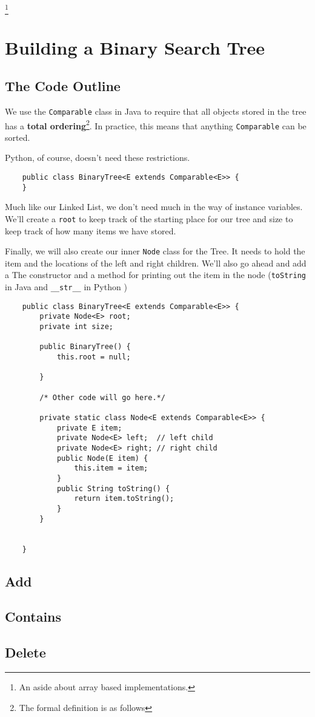 \footnote{An aside about array based implementations.}

\section{Building a Binary Search Tree}

\subsection{The Code Outline}


We use the \texttt{Comparable} class in Java to require that all objects stored in the tree has a \textbf{total ordering}\footnote{The formal definition is as follows}.%
In practice, this means that anything \texttt{Comparable} can be sorted.

Python, of course, doesn't need these restrictions.
\begin{verbatim}
	public class BinaryTree<E extends Comparable<E>> {
	}
\end{verbatim}




Much like our Linked List, we don't need much in the way of instance variables.  We'll create a \texttt{root} to keep track of the starting place for our tree and size to keep track of how many items we have stored.

Finally, we will also create our inner \texttt{Node} class for the Tree.
It needs to hold the item and the locations of the left and right children.
We'll also go ahead and add a The constructor and a method for printing out the item in the node (\texttt{toString} in Java and \texttt{\_\_str\_\_} in Python )

\begin{verbatim}
	public class BinaryTree<E extends Comparable<E>> {
		private Node<E> root;
		private int size;
		
		public BinaryTree() {
			this.root = null;
			
		}
		
		/* Other code will go here.*/
		
		private static class Node<E extends Comparable<E>> {
			private E item;
			private Node<E> left;  // left child
			private Node<E> right; // right child
			public Node(E item) {
				this.item = item;
			}
			public String toString() {
				return item.toString();
			}
		}
		
		
	}
\end{verbatim}


\subsection{Add}




\subsection{Contains}

\subsection{Delete}
